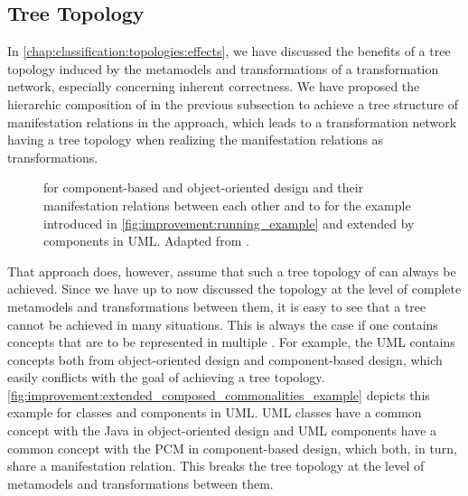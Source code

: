 \subsection{Tree Topology}
\label{chap:improvement:commonalities:tree}

In \autoref{chap:classification:topologies:effects}, we have discussed the benefits of a tree topology induced by the metamodels and transformations of a transformation network, especially concerning inherent correctness.
We have proposed the hierarchic composition of \conceptmetamodels in the previous subsection to achieve a tree structure of manifestation relations in the \commonalities approach, which leads to a transformation network having a tree topology when realizing the manifestation relations as transformations.

\begin{figure}
    \centering
    
    \caption[Example for tree topology of \commonalities]{\Conceptmetamodels for component-based and object-oriented design and their manifestation relations between each other and to \concretemetamodels for the example introduced in \autoref{fig:improvement:running_example} and extended by components in \gls{UML}. Adapted from .}
    \label{fig:improvement:extended_composed_commonalities_example}
\end{figure}

That approach does, however, assume that such a tree topology of \conceptmetamodels can always be achieved.
Since we have up to now discussed the topology at the level of complete metamodels and transformations between them, it is easy to see that a tree cannot be achieved in many situations.
This is always the case if one \concretemetamodel contains concepts that are to be represented in multiple \conceptmetamodels.
For example, the \gls{UML} contains concepts both from object-oriented design and component-based design, which easily conflicts with the goal of achieving a tree topology.
\autoref{fig:improvement:extended_composed_commonalities_example} depicts this example for classes and components in \gls{UML}.
\gls{UML} classes have a common concept with the \concretemetamodels Java in object-oriented design and \gls{UML} components have a common concept with the \concretemetamodel \gls{PCM} in component-based design, which both, in turn, share a manifestation relation. This breaks the tree topology at the level of metamodels and transformations between them.

